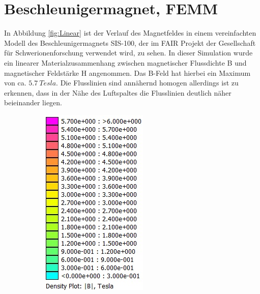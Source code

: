 \section{Beschleunigermagnet, FEMM}

In Abbildung \ref{fig:Linear} ist der Verlauf des Magnetfeldes in einem vereinfachten Modell des Beschleunigermagnets SIS-100, der im FAIR Projekt der Gesellschaft für Schwerionenforschung verwendet wird, zu sehen. In dieser Simulation wurde ein linearer Materialzusammenhang zwischen magnetischer Flussdichte B und magnetischer Feldstärke H angenommen. Das B-Feld hat hierbei ein Maximum von ca. $\SI{5,7}{Tesla}$. Die Flusslinien sind annähernd homogen allerdings ist zu erkennen, dass in der Nähe des Luftspaltes die Flusslinien deutlich näher beieinander liegen.

\begin{figure}[h!]
	\centering
	\begin{subfigure}[h]{.28\textwidth}
		\centering
		\includegraphics[width=\textwidth]{data/skala_linear}

\end{subfigure}
\end{figure}
